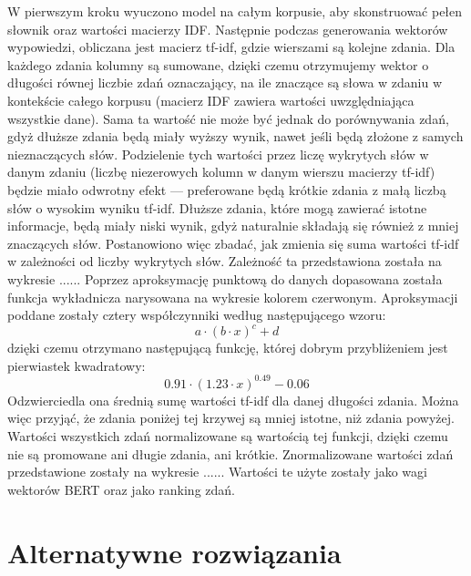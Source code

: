 		W pierwszym kroku wyuczono model na całym korpusie, aby skonstruować pełen słownik oraz wartości macierzy IDF\@.
		Następnie podczas generowania wektorów wypowiedzi, obliczana jest macierz tf-idf, gdzie wierszami są kolejne zdania.
		Dla każdego zdania kolumny są sumowane, dzięki czemu otrzymujemy wektor o długości równej liczbie zdań oznaczający,
			na ile znaczące są słowa w zdaniu w kontekście całego korpusu (macierz IDF zawiera wartości uwzględniająca wszystkie dane).
		Sama ta wartość nie może być jednak do porównywania zdań, gdyż dłuższe zdania będą miały wyższy wynik, nawet jeśli będą złożone z samych nieznaczących słów.
		Podzielenie tych wartości przez liczę wykrytych słów w danym zdaniu (liczbę niezerowych kolumn w danym wierszu macierzy tf-idf) będzie miało odwrotny efekt
			--- preferowane będą krótkie zdania z małą liczbą słów o wysokim wyniku tf-idf.
		Dłuższe zdania, które mogą zawierać istotne informacje, będą miały niski wynik, gdyż naturalnie składają się również z mniej znaczących słów.
		Postanowiono więc zbadać, jak zmienia się suma wartości tf-idf w zależności od liczby wykrytych słów.
		Zależność ta przedstawiona została na wykresie ...... 
		Poprzez aproksymację punktową do danych dopasowana została funkcja wykładnicza narysowana na wykresie kolorem czerwonym.
		Aproksymacji poddane zostały cztery współczynniki według następującego wzoru:
		\[a\cdot {(b\cdot x)}^c + d\]
		dzięki czemu otrzymano następującą funkcję, której dobrym przybliżeniem jest pierwiastek kwadratowy:
		\[0.91\cdot {(1.23\cdot x)}^{0.49} - 0.06\]
		Odzwierciedla ona średnią sumę wartości tf-idf dla danej długości zdania.
		Można więc przyjąć, że zdania poniżej tej krzywej są mniej istotne, niż zdania powyżej.
		Wartości wszystkich zdań normalizowane są wartością tej funkcji, dzięki czemu nie są promowane ani długie zdania, ani krótkie.
		Znormalizowane wartości zdań przedstawione zostały na wykresie ......
		Wartości te użyte zostały jako wagi wektorów BERT oraz jako ranking zdań.

\section{Alternatywne rozwiązania}
